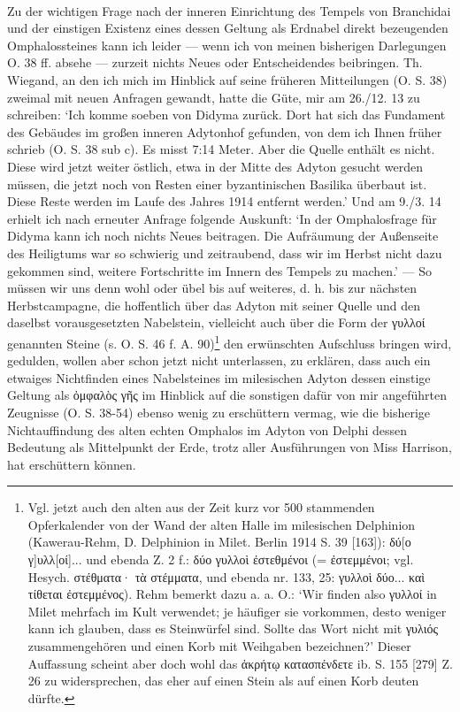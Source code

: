 \documentclass[a4paper, 11pt, oneside]{article}
\begin{document}
\paragraph{}
Zu der wichtigen Frage nach der inneren Einrichtung des Tempels von Branchidai und der einstigen Existenz eines dessen Geltung als Erdnabel direkt bezeugenden Omphalossteines kann ich leider --- wenn ich von meinen bisherigen Darlegungen O. 38 ff. absehe --- zurzeit nichts Neues oder Entscheidendes beibringen. Th. Wiegand, an den ich mich im Hinblick auf seine früheren Mitteilungen (O. S. 38) zweimal mit neuen Anfragen gewandt, hatte die Güte, mir am 26./12. 13 zu schreiben: `Ich komme soeben von Didyma zurück. Dort hat sich das Fundament des Gebäudes im großen inneren Adytonhof gefunden, von dem ich Ihnen früher schrieb (O. S. 38 sub c). Es misst 7:14 Meter. Aber die Quelle enthält es nicht. Diese wird jetzt weiter östlich, etwa in der Mitte des Adyton gesucht werden müssen, die jetzt noch von Resten einer byzantinischen Basilika überbaut ist. Diese Reste werden im Laufe des Jahres 1914 entfernt werden.' Und am 9./3. 14 erhielt ich nach erneuter Anfrage folgende Auskunft: `In der Omphalosfrage für Didyma kann ich noch nichts Neues beitragen. Die Aufräumung der Außenseite des Heiligtums war so schwierig und zeitraubend, dass wir im Herbst nicht dazu gekommen sind, weitere Fortschritte im Innern des Tempels zu machen.' --- So müssen wir uns denn wohl oder übel bis auf weiteres, d. h. bis zur nächsten Herbstcampagne, die hoffentlich über das Adyton mit seiner Quelle und den daselbst vorausgesetzten Nabelstein, vielleicht auch über die Form der γυλλοί genannten Steine (s. O. S. 46 f. A. 90)\footnote{Vgl. jetzt auch den alten aus der Zeit kurz vor 500 stammenden Opferkalender von der Wand der alten Halle im milesischen Delphinion (Kawerau-Rehm, D. Delphinion in Milet. Berlin 1914 S. 39 [163]): δύ[ο γ]υλλ[οί]... und ebenda Z. 2 f.: δύο γυλλοὶ ἐστεθμένοι (= ἐστεμμένοι; vgl. Hesych. στέθματα· τὰ στέμματα, und ebenda nr. 133, 25: γυλλοὶ δύο... καὶ τίθεται ἐστεμμένος). Rehm bemerkt dazu a. a. O.: `Wir finden also γυλλοί in Milet mehrfach im Kult verwendet; je häufiger sie vorkommen, desto weniger kann ich glauben, dass es Steinwürfel sind. Sollte das Wort nicht mit γυλιός zusammengehören und einen Korb mit Weihgaben bezeichnen?' Dieser Auffassung scheint aber doch wohl das ἀκρήτῳ κατασπένδετε ib. S. 155 [279] Z. 26 zu widersprechen, das eher auf einen Stein als auf einen Korb deuten dürfte.} den erwünschten Aufschluss bringen wird, gedulden, wollen aber schon jetzt nicht unterlassen, zu erklären, dass auch ein etwaiges Nichtfinden eines Nabelsteines im milesischen Adyton dessen einstige Geltung als ὀμφαλὸς γῆς im Hinblick auf die sonstigen dafür von mir angeführten Zeugnisse (O. S. 38-54) ebenso wenig zu erschüttern vermag, wie die bisherige Nichtauffindung des alten echten Omphalos im Adyton von Delphi dessen Bedeutung als Mittelpunkt der Erde, trotz aller Ausführungen von Miss Harrison, hat erschüttern können.
\end{document}
